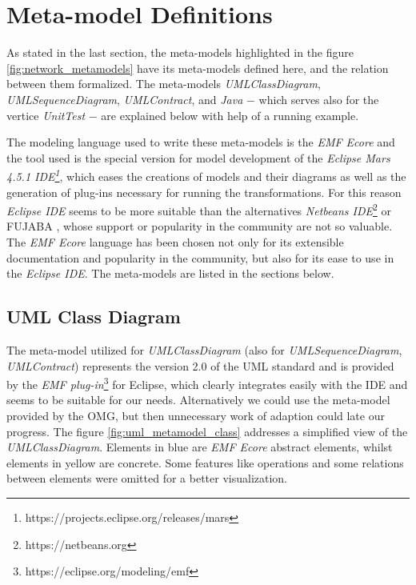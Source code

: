 \documentclass[tuberlin,cic,tc,english,noabntcite]{iiufrgs}
\begin{document}
\section{Meta-model Definitions}
As stated in the last section, the meta-models highlighted in the figure \ref{fig:network_metamodels} have its meta-models defined here, and the relation between them formalized. The meta-models \emph{UMLClassDiagram}, \emph{UMLSequenceDiagram}, \emph{UMLContract}, and \emph{Java} $-$ which serves also for the vertice \emph{UnitTest} $-$ are explained below with help of a running example.

The modeling language used to write these meta-models is the \emph{EMF Ecore} and the tool used is the special version for model development of the \emph{Eclipse Mars 4.5.1 IDE\footnote{https://projects.eclipse.org/releases/mars}}, which eases the creations of models and their diagrams as well as the generation of plug-ins necessary for running the transformations. For this reason \emph{Eclipse IDE} seems to be more suitable than the alternatives \emph{Netbeans IDE}\footnote{https://netbeans.org} or FUJABA \citep{nickel2000fujaba}, whose support or popularity in the community are not so valuable. The \emph{EMF Ecore} language has been chosen not only for its extensible documentation and popularity in the community, but also for its ease to use in the \emph{Eclipse IDE}. The meta-models are listed in the sections below.

\subsection{UML Class Diagram}
The meta-model utilized for \emph{UMLClassDiagram} (also for \emph{UMLSequenceDiagram}, \emph{UMLContract}) represents the version 2.0 of the UML standard and is provided by the \emph{EMF plug-in}\footnote{https://eclipse.org/modeling/emf} for Eclipse, which clearly integrates easily with the IDE and seems to be suitable for our needs. Alternatively we could use the meta-model provided by the OMG, but then unnecessary work of adaption could late our progress. The figure \ref{fig:uml_metamodel_class} addresses a simplified view of the \emph{UMLClassDiagram}. Elements in blue are \emph{EMF Ecore} abstract elements, whilst elements in yellow are concrete. Some features like operations and some relations between elements were omitted for a better visualization. 
\end{document}

